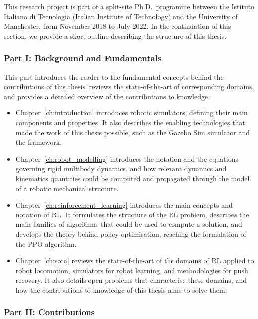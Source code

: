 \vspace{3mm}
This research project is part of a split-site Ph.D.\ programme between the Istituto Italiano di Tecnologia (Italian Institute of Technology) and the University of Manchester, from November 2018 to July 2022.
In the continuation of this section, we provide a short outline describing the structure of this thesis.

\subsubsection{Part I: Background and Fundamentals}

This part introduces the reader to the fundamental concepts behind the contributions of this thesis, reviews the state-of-the-art of corresponding domains, and provides a detailed overview of the contributions to knowledge.

\begin{itemize}
    \item Chapter~\ref{ch:introduction} introduces robotic simulators, defining their main components and properties. It also describes the enabling technologies that made the work of this thesis possible, such as the Gazebo Sim simulator and the \jax framework.
    \item Chapter~\ref{ch:robot_modelling} introduces the notation and the equations governing rigid multibody dynamics, and how relevant dynamics and kinematics quantities could be computed and propagated through the model of a robotic mechanical structure.
    \item Chapter~\ref{ch:reinforcement_learning} introduces the main concepts and notation of \ac{RL}. It formulates the structure of the \ac{RL} problem, describes the main families of algorithms that could be used to compute a solution, and develops the theory behind policy optimisation, reaching the formulation of the \acl{PPO} algorithm.
    \item Chapter~\ref{ch:sota} reviews the state-of-the-art of the domains of \acl{RL} applied to robot locomotion, simulators for robot learning, and methodologies for push recovery. It also details open problems that characterise these domains, and how the contributions to knowledge of this thesis aims to solve them.
\end{itemize}

\subsubsection{Part II: Contributions}

